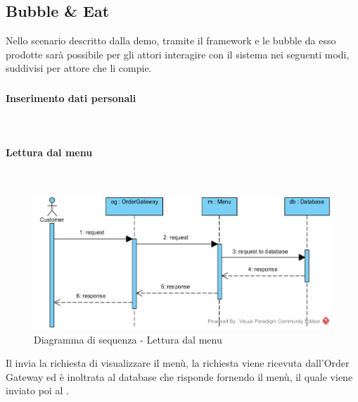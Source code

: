 \subsection{Bubble \& Eat}
Nello scenario descritto dalla demo, tramite il framework e le bubble da esso prodotte sarà possibile per gli attori interagire con il sistema nei seguenti modi, suddivisi per attore che li compie.

\subsubsection{\Customer{}}
\begin{samepage}
\paragraph{Inserimento dati personali}\mbox{}\\
\end{samepage}

\begin{samepage}
\paragraph{Lettura dal menu}\mbox{}\\
\end{samepage}
\begin{figure}[H]
	\centering
	\includegraphics[width=15cm]{../../documenti/SpecificaTecnica/diagrammi/sequenza/client_visualizza_menu.png}
	\caption{Diagramma di sequenza - Lettura dal menu}
\end{figure}
Il \Customer{} invia la richiesta di visualizzare il menù, la richiesta viene ricevuta dall'Order Gateway ed è inoltrata al database che risponde fornendo il menù, il quale viene inviato poi al \Customer{}.

